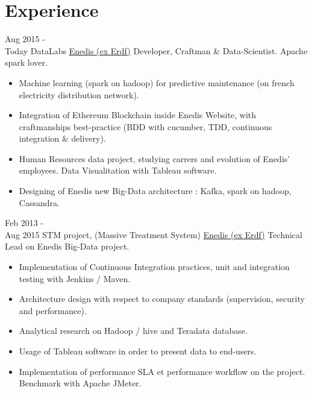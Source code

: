 \documentclass[letterpaper]{twentysecondcv} %
\begin{document}
\makeprofile %




\section{Experience}



\begin{twenty} %

	\twentyitem
    	{Aug 2015 - \\ Today}
        {DataLabs}
        {\href{http://www.enedis.fr/}{Enedis (ex Erdf)}}
        {Developer, Craftman \& Data-Scientist. Apache spark lover.}
        {
        {\begin{itemize}
        \item Machine learning (spark on hadoop) for predictive maintenance (on french electricity distribution network).
        \item Integration of Ethereum Blockchain inside Enedis Website, with craftmanships best-practice (BDD with cucumber, TDD, continuous integration \& delivery).
        \item Human Resources data project, studying carrers and evolution of Enedis' employees. Data Visualitation with Tableau software.
        \item Designing of Enedis new Big-Data architecture : Kafka, spark on hadoop, Cassandra.
        
    \end{itemize}}
        }
        
\twentyitem
    	{Feb 2013 - \\Aug 2015}
        {STM project, (Massive Treatment System)}
        {\href{http://www.enedis.fr/}{Enedis (ex Erdf)}}
        {Technical Lead on Enedis Big-Data project.}
        {
        {\begin{itemize}
        \item Implementation of Continuous Integration practices, unit and integration testing with Jenkins / Maven.
        \item Architecture design with respect to company standards (supervision, security and performance).
        \item Analytical research on Hadoop / hive and Teradata database.
        \item Usage of Tableau software in order to present data to end-users.
        \item Implementation of performance SLA et performance workflow on the project. Benchmark with Apache JMeter.
    \end{itemize}}
        }
        

\end{twenty}
\end{document}
